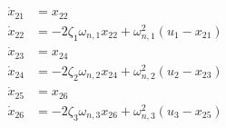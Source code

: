 \vspace{0.5cm}

\begin{align}
	\dot{x}_{21} &= x_{22} \\[4pt]
	\dot{x}_{22} &= -2 \zeta_1 \omega_{n,1} x_{22} + \omega_{n,1}^2 (u_1 - x_{21}) \\[6pt]
	\dot{x}_{23} &= x_{24} \\[4pt]
	\dot{x}_{24} &= -2 \zeta_2 \omega_{n,2} x_{24} + \omega_{n,2}^2 (u_2 - x_{23}) \\[6pt]
	\dot{x}_{25} &= x_{26} \\[4pt]
	\dot{x}_{26} &= -2 \zeta_3 \omega_{n,3} x_{26} + \omega_{n,3}^2 (u_3 - x_{25}) \\[6pt]
\end{align}